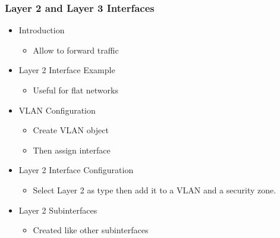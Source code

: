\subsubsection{Layer 2 and Layer 3 Interfaces}
    \begin{itemize}
        \item Introduction
            \begin{itemize}
                \item Allow to forward traffic
            \end{itemize}
        \item Layer 2 Interface Example
            \begin{itemize}
                \item Useful for flat networks
            \end{itemize}
        \item VLAN Configuration
            \begin{itemize}
                \item Create VLAN object
                \item Then assign interface
            \end{itemize}
        \item Layer 2 Interface Configuration
            \begin{itemize}
                \item Select Layer 2 as type then add it to a VLAN and a security zone.
            \end{itemize}
        \item Layer 2 Subinterfaces
            \begin{itemize}
                \item Created like other subinterfaces
            \end{itemize}
    \end{itemize}
    
